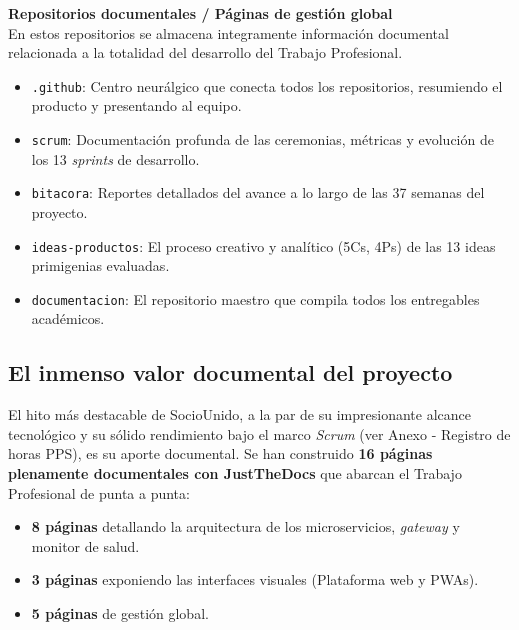 \textbf{Repositorios documentales / Páginas de gestión global} \\
En estos repositorios se almacena integramente información documental relacionada a la totalidad del desarrollo del Trabajo Profesional.
\begin{itemize}
    \item \texttt{.github}: Centro neurálgico que conecta todos los repositorios, resumiendo el producto y presentando al equipo.
    \item \texttt{scrum}: Documentación profunda de las ceremonias, métricas y evolución de los 13 \textit{sprints} de desarrollo.
    \item \texttt{bitacora}: Reportes detallados del avance a lo largo de las 37 semanas del proyecto.
    \item \texttt{ideas-productos}: El proceso creativo y analítico (5Cs, 4Ps) de las 13 ideas primigenias evaluadas.
    \item \texttt{documentacion}: El repositorio maestro que compila todos los entregables académicos.
\end{itemize}

\subsection{El inmenso valor documental del proyecto}

El hito más destacable de SocioUnido, a la par de su impresionante alcance tecnológico y su sólido rendimiento bajo el marco \textit{Scrum} (ver Anexo - Registro de horas PPS), es su aporte documental. Se han construido \textbf{16 páginas plenamente documentales con JustTheDocs} que abarcan el Trabajo Profesional de punta a punta:

\begin{itemize}
    \item \textbf{8 páginas} detallando la arquitectura de los microservicios, \textit{gateway} y monitor de salud.
    \item \textbf{3 páginas} exponiendo las interfaces visuales (Plataforma web y PWAs).
    \item \textbf{5 páginas} de gestión global.
\end{itemize}

